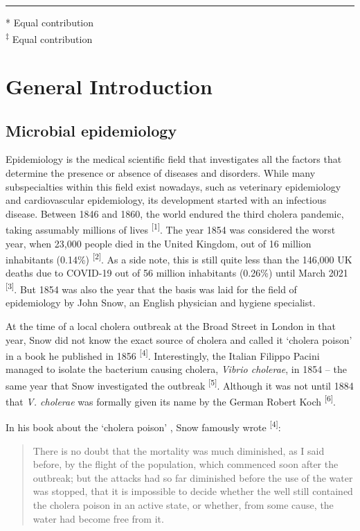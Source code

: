 \documentclass[
]{book}
\begin{document}
\begin{center}\rule{0.5\linewidth}{0.5pt}\end{center}

* Equal contribution\\
\textsuperscript{‡} Equal contribution

\hypertarget{introduction}{%
\chapter{General Introduction}\label{introduction}}

\hypertarget{microbial-epidemiology}{%
\section{Microbial epidemiology}\label{microbial-epidemiology}}

Epidemiology is the medical scientific field that investigates all the factors that determine the presence or absence of diseases and disorders. While many subspecialties within this field exist nowadays, such as veterinary epidemiology and cardiovascular epidemiology, its development started with an infectious disease. Between 1846 and 1860, the world endured the third cholera pandemic, taking assumably millions of lives \textsuperscript{{[}1{]}}. The year 1854 was considered the worst year, when 23,000 people died in the United Kingdom, out of 16 million inhabitants (0.14\%) \textsuperscript{{[}2{]}}. As a side note, this is still quite less than the 146,000 UK deaths due to COVID-19 out of 56 million inhabitants (0.26\%) until March 2021 \textsuperscript{{[}3{]}}. But 1854 was also the year that the basis was laid for the field of epidemiology by John Snow, an English physician and hygiene specialist.

At the time of a local cholera outbreak at the Broad Street in London in that year, Snow did not know the exact source of cholera and called it `cholera poison' in a book he published in 1856 \textsuperscript{{[}4{]}}. Interestingly, the Italian Filippo Pacini managed to isolate the bacterium causing cholera, \emph{Vibrio cholerae}, in 1854 -- the same year that Snow investigated the outbreak \textsuperscript{{[}5{]}}. Although it was not until 1884 that \emph{V. cholerae} was formally given its name by the German Robert Koch \textsuperscript{{[}6{]}}.

In his book about the `cholera poison' , Snow famously wrote \textsuperscript{{[}4{]}}:

\begin{quote}
There is no doubt that the mortality was much diminished, as I said before, by the flight of the population, which commenced soon after the outbreak; but the attacks had so far diminished before the use of the water was stopped, that it is impossible to decide whether the well still contained the cholera poison in an active state, or whether, from some cause, the water had become free from it.
\end{quote}
\end{document}
